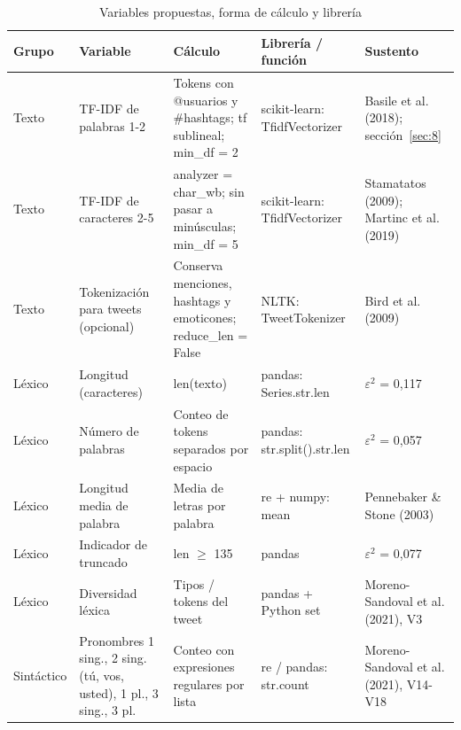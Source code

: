 \documentclass[10pt,twocolumn]{article}
\begin{document}
\begin{table}[!t]
\centering\scriptsize
\caption{Variables propuestas, forma de cálculo y librería}\label{tab:6}
\renewcommand{\arraystretch}{1.15}
\begin{tabular}{p{}p{}p{}p{}p{}}
\hline
\raggedright\textbf{Grupo} & \raggedright\textbf{Variable} & \raggedright\textbf{Cálculo} & \raggedright\textbf{Librería / función} & \raggedright\textbf{Sustento} \tabularnewline \hline
\raggedright Texto & \raggedright TF-IDF de palabras 1-2 & \raggedright Tokens con @usuarios y \#hashtags; tf sublineal; min\_df = 2 & \raggedright scikit-learn: TfidfVectorizer & \raggedright Basile et al. (2018); sección~\ref{sec:8} \tabularnewline
\raggedright Texto & \raggedright TF-IDF de caracteres 2-5 & \raggedright analyzer = \textquotedbl{}char\_wb\textquotedbl{}; sin pasar a minúsculas; min\_df = 5 & \raggedright scikit-learn: TfidfVectorizer & \raggedright Stamatatos (2009); Martinc et al. (2019) \tabularnewline
\raggedright Texto & \raggedright Tokenización para tweets (opcional) & \raggedright Conserva menciones, hashtags y emoticones; reduce\_len = False & \raggedright NLTK: TweetTokenizer & \raggedright Bird et al. (2009) \tabularnewline
\raggedright Léxico & \raggedright Longitud (caracteres) & \raggedright len(texto) & \raggedright pandas: Series.str.len & \raggedright $\varepsilon^2$ = 0,117 \tabularnewline
\raggedright Léxico & \raggedright Número de palabras & \raggedright Conteo de tokens separados por espacio & \raggedright pandas: str.split().str.len & \raggedright $\varepsilon^2$ = 0,057 \tabularnewline
\raggedright Léxico & \raggedright Longitud media de palabra & \raggedright Media de letras por palabra & \raggedright re + numpy: mean & \raggedright Pennebaker \& Stone (2003) \tabularnewline
\raggedright Léxico & \raggedright Indicador de truncado & \raggedright len $\geq$ 135 & \raggedright pandas & \raggedright $\varepsilon^2$ = 0,077 \tabularnewline
\raggedright Léxico & \raggedright Diversidad léxica & \raggedright Tipos / tokens del tweet & \raggedright pandas + Python set & \raggedright Moreno-Sandoval et al. (2021), V3 \tabularnewline
\raggedright Sintáctico & \raggedright Pronombres 1\textordfeminine{} sing., 2\textordfeminine{} sing. (tú, vos, usted), 1\textordfeminine{} pl., 3\textordfeminine{} sing., 3\textordfeminine{} pl. & \raggedright Conteo con expresiones regulares por lista & \raggedright re / pandas: str.count & \raggedright Moreno-Sandoval et al. (2021), V14-V18 \tabularnewline

\end{tabular}
\end{table}
\end{document}

